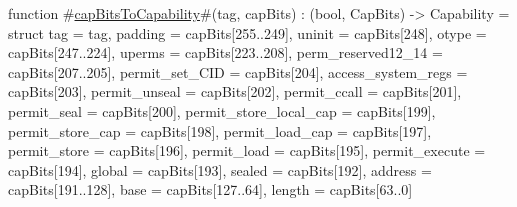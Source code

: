 function #\hyperref[zcapBitsToCapability]{capBitsToCapability}#(tag, capBits) : (bool, CapBits) -> Capability =
  struct {
    tag                        = tag,
    padding                    = capBits[255..249],
    uninit                     = capBits[248],
    otype                      = capBits[247..224],
    uperms                     = capBits[223..208],
    perm_reserved12_14         = capBits[207..205],
    permit_set_CID             = capBits[204],
    access_system_regs         = capBits[203],
    permit_unseal              = capBits[202],
    permit_ccall               = capBits[201],
    permit_seal                = capBits[200],
    permit_store_local_cap     = capBits[199],
    permit_store_cap           = capBits[198],
    permit_load_cap            = capBits[197],
    permit_store               = capBits[196],
    permit_load                = capBits[195],
    permit_execute             = capBits[194],
    global                     = capBits[193],
    sealed                     = capBits[192],
    address                    = capBits[191..128],
    base                       = capBits[127..64],
    length                     = capBits[63..0]
  }
